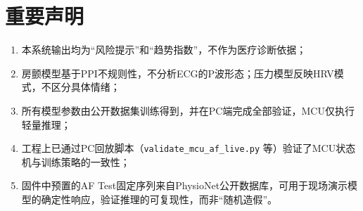 \documentclass[UTF8]{ctexart}
\begin{document}
\section{重要声明}
\begin{enumerate}
    \item 本系统输出均为“风险提示”和“趋势指数”，不作为医疗诊断依据；
    \item 房颤模型基于PPI不规则性，不分析ECG的P波形态；压力模型反映HRV模式，不区分具体情绪；
    \item 所有模型参数由公开数据集训练得到，并在PC端完成全部验证，MCU仅执行轻量推理；
    \item 工程上已通过PC回放脚本（\texttt{validate\_mcu\_af\_live.py} 等）验证了MCU状态机与训练策略的一致性；
    \item 固件中预置的AF Test固定序列来自PhysioNet公开数据库，可用于现场演示模型的确定性响应，验证推理的可复现性，而非“随机造假”。
\end{enumerate}
\end{document}
